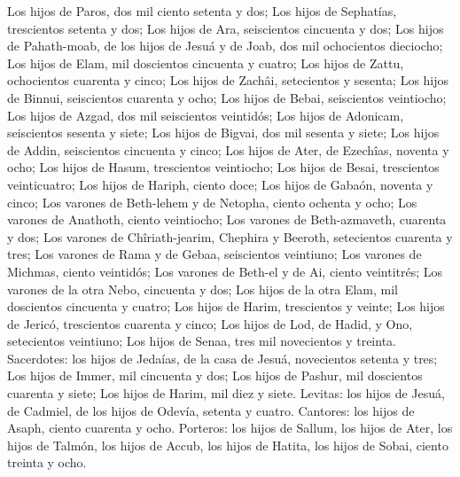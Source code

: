  Los hijos de Paros, dos mil ciento setenta y dos;
 Los hijos de Sephatías, trescientos setenta y dos;
 Los hijos de Ara, seiscientos cincuenta y dos;
 Los hijos de Pahath-moab, de los hijos de Jesuá y de Joab,
dos mil ochocientos dieciocho;  Los hijos de Elam, mil
doscientos cincuenta y cuatro;  Los hijos de Zattu,
ochocientos cuarenta y cinco;  Los hijos de Zachâi,
setecientos y sesenta;  Los hijos de Binnui, seiscientos
cuarenta y ocho;  Los hijos de Bebai, seiscientos
veintiocho;  Los hijos de Azgad, dos mil seiscientos
veintidós;  Los hijos de Adonicam, seiscientos sesenta y
siete;  Los hijos de Bigvai, dos mil sesenta y siete;
 Los hijos de Addin, seiscientos cincuenta y cinco;
 Los hijos de Ater, de Ezechîas, noventa y ocho;
 Los hijos de Hasum, trescientos veintiocho; 
Los hijos de Besai, trescientos veinticuatro;  Los hijos de
Hariph, ciento doce;  Los hijos de Gabaón, noventa y cinco;
 Los varones de Beth-lehem y de Netopha, ciento ochenta y
ocho;  Los varones de Anathoth, ciento veintiocho;
 Los varones de Beth-azmaveth, cuarenta y dos;
 Los varones de Chîriath-jearim, Chephira y Beeroth,
setecientos cuarenta y tres;  Los varones de Rama y de
Gebaa, seiscientos veintiuno;  Los varones de Michmas,
ciento veintidós;  Los varones de Beth-el y de Ai, ciento
veintitrés;  Los varones de la otra Nebo, cincuenta y dos;
 Los hijos de la otra Elam, mil doscientos cincuenta y
cuatro;  Los hijos de Harim, trescientos y veinte;
 Los hijos de Jericó, trescientos cuarenta y cinco;
 Los hijos de Lod, de Hadid, y Ono, setecientos veintiuno;
 Los hijos de Senaa, tres mil novecientos y treinta.
 Sacerdotes: los hijos de Jedaías, de la casa de Jesuá,
novecientos setenta y tres;  Los hijos de Immer, mil
cincuenta y dos;  Los hijos de Pashur, mil doscientos
cuarenta y siete;  Los hijos de Harim, mil diez y siete.
 Levitas: los hijos de Jesuá, de Cadmiel, de los hijos de
Odevía, setenta y cuatro.  Cantores: los hijos de Asaph,
ciento cuarenta y ocho.  Porteros: los hijos de Sallum, los
hijos de Ater, los hijos de Talmón, los hijos de Accub, los hijos de
Hatita, los hijos de Sobai, ciento treinta y ocho.

